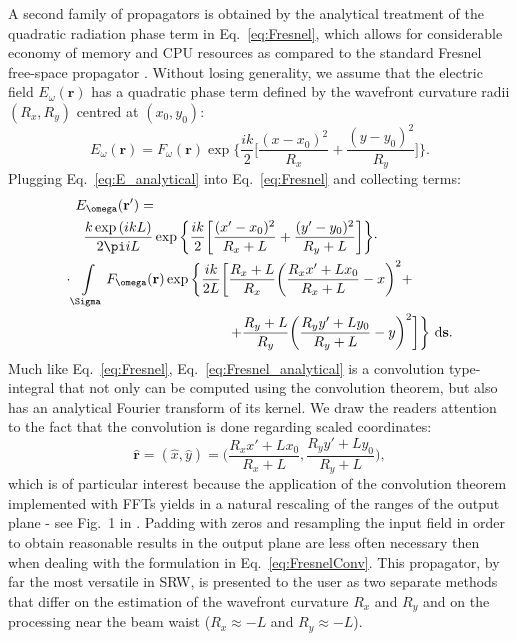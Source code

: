 \documentclass{iucr}              %
\begin{document}
A second family of propagators is obtained by the analytical treatment of the quadratic radiation phase term in Eq.~\ref{eq:Fresnel}, which allows for considerable economy of memory and CPU resources as compared to
the standard Fresnel free-space propagator \cite{ChubarCelestre}. Without losing generality, we assume that the electric field $E_\omega(\textbf{r})$ has a quadratic phase term defined by the wavefront curvature radii $(R_x, R_y)$ centred at $(x_0,y_0)$:
 \begin{equation}\label{eq:E_analytical}
    E_\omega(\textbf{r}) = F_\omega(\textbf{r})\exp\bigg\{ \frac{ik}{2}\bigg[ \frac{(x-x_0)^2}{R_x} + \frac{(y-y_0)^2}{R_y} \bigg]\bigg\}.
\end{equation}
Plugging Eq.~\ref{eq:E_analytical} into Eq.~\ref{eq:Fresnel} and collecting terms:
\begin{equation}\label{eq:Fresnel_analytical}
\begin{split}
    E_\omega(\textbf{r}') = \qquad\qquad\qquad\qquad\qquad\qquad\qquad\qquad\qquad\quad &\\
    \frac{k\exp{(ikL)}}{2\pi i L}\exp\bigg\{ \frac{ik}{2}\bigg[ \frac{(x'-x_0)^2}{R_x+L} + \frac{(y'-y_0)^2}{R_y+L} \bigg] \bigg\}\cdot \qquad\quad &\\
    \cdot\int\limits_{\Sigma}{F_\omega(\textbf{r})\exp{\bigg\{ \frac{ik}{2L}\bigg[ \frac{R_x+L}{R_x}\bigg(\frac{R_xx'+Lx_0}{R_x+L}-x\bigg)^2+}} \enspace\\
    \hfill+ \frac{R_y+L}{R_y}\bigg(\frac{R_yy'+Ly_0}{R_y+L}-y\bigg)^2\bigg] & \bigg\}~\mathrm{d}\textbf{s}.
\end{split}
\end{equation}
Much like Eq.~\ref{eq:Fresnel}, Eq.~\ref{eq:Fresnel_analytical} is a convolution type-integral that not only can be computed using the convolution theorem, but also has an analytical Fourier transform of its kernel. We draw the readers attention to the fact that the convolution is done regarding scaled coordinates:
\begin{equation}\label{eq:coordinates}
\hat{\textbf{r}}=(\hat{x},\hat{y})=\bigg(\frac{R_xx'+Lx_0}{R_x+L}, \frac{R_yy'+Ly_0}{R_y+L}\bigg),
\end{equation}
which is of particular interest because the application of the convolution theorem implemented with FFTs yields in a natural rescaling of the ranges of the output plane - see Fig.~1 in \cite{ChubarCelestre}. Padding with zeros and resampling the input field in order to obtain reasonable results in the output plane are less often necessary then when dealing with the formulation in Eq.~\ref{eq:FresnelConv}. This propagator, by far the most versatile in SRW, is presented to the user as two separate methods that differ on the estimation of the wavefront curvature $R_x$ and $R_y$ and on the processing near the beam waist ($R_x\approx-L$ and $R_y\approx-L$). 
\end{document}
